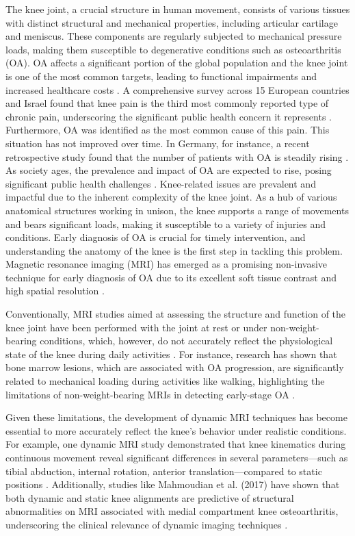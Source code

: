 \documentclass{micro-econ-thesis}
\begin{document}
The knee joint, a crucial structure in human movement, consists of various tissues with distinct structural and mechanical properties, including articular cartilage and meniscus. These components are regularly subjected to mechanical pressure loads, making them susceptible to degenerative conditions such as osteoarthritis (OA). OA affects a significant portion of the global population and the knee joint is one of the most common targets, leading to functional impairments and increased healthcare costs \parencite{WHO}. A comprehensive survey across 15 European countries and Israel found that knee pain is the third most commonly reported type of chronic pain, underscoring the significant public health concern it represents \parencite{breivik_survey_2006}. Furthermore, OA was identified as the most common cause of this pain. This situation has not improved over time. In Germany, for instance, a recent retrospective study found that the number of patients with OA is steadily rising \parencite{obermuller_epidemiology_2024}. As society ages, the prevalence and impact of OA are expected to rise, posing significant public health challenges \parencite{yelin_burden_2016}. Knee-related issues are prevalent and impactful due to the inherent complexity of the knee joint. As a hub of various anatomical structures working in unison, the knee supports a range of movements and bears significant loads, making it susceptible to a variety of injuries and conditions. Early diagnosis of OA is crucial for timely intervention, and understanding the anatomy of the knee is the first step in tackling this problem. Magnetic resonance imaging (MRI) has emerged as a promising non-invasive technique for early diagnosis of OA due to its excellent soft tissue contrast and high spatial resolution \parencite{kijowski_osteoarthritis_2020}. 

Conventionally, MRI studies aimed at assessing the structure and function of the knee joint have been performed with the joint at rest or under non-weight-bearing conditions, which, however, do not accurately reflect the physiological state of the knee during daily activities \parencite{blankevoort_envelope_1988}. For instance, research has shown that bone marrow lesions, which are associated with OA progression, are significantly related to mechanical loading during activities like walking, highlighting the limitations of non-weight-bearing MRIs in detecting early-stage OA \parencite{bennell_bone_2010}. 

Given these limitations, the development of dynamic MRI techniques has become essential to more accurately reflect the knee's behavior under realistic conditions. For example, one dynamic MRI study demonstrated that knee kinematics during continuous movement reveal significant differences in several parameters---such as tibial abduction, internal rotation, anterior translation---compared to static positions \parencite{dentremont_dynamicbased_2013}. Additionally, studies like Mahmoudian et al. (2017) have shown that both dynamic and static knee alignments are predictive of structural abnormalities on MRI associated with medial compartment knee osteoarthritis, underscoring the clinical relevance of dynamic imaging techniques \parencite{mahmoudian_dynamic_2017}. 
\end{document}
